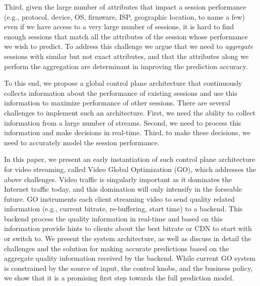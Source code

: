 Third, given the large number of attributes that impact a session performance (e.g., protocol, device, OS, firmware, ISP, geographic location, to name a few) even if we have access to a very large number of sessions, it is hard to find enough sessions that match all the attributes of the session whose performance we wish to predict. To address this challenge we argue that we need to \emph{aggregate} sessions with similar but not exact attributes, and that the attributes along we perform the aggregation are determinant in improving the prediction accuracy.

To this end, we propose a global control plane architecture that continuously collects information about the performance of existing sessions and use this information to maximize performance of other sessions. There are several challenges to implement such an architecture. First, we need the ability to collect information from a large number of streams. Second, we need to process this information and make decisions in real-time. Third, to make these decisions, we need to accurately model the session performance. 


In this paper, we present an early instantiation of such control plane architecture for video streaming, called Video Global Optimization (GO), which addresses the above challenges.  Video traffic is singularly important as it dominates the Internet traffic today, and this domination will only intensify in the forseable future. GO instruments each client streaming video to send quality related information (e.g., current bitrate, re-buffering, start time) to a backend. This backend process the quality information in real-time and based on this information provide hints to clients about the best bitrate or CDN to start with or switch to. We present the system architecture, as well as discuss in detail the challenges and the solution for making accurate predictions based on the aggregate quality information received by the backend. While current GO system is constrained by the source of input, the control knobs, and the business policy, we show that it is a promising first step towards the full prediction model. 
   
